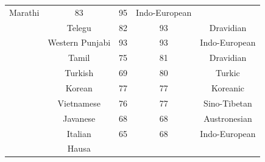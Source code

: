 {\begin{tabular}{|c|c|c|c|c|}
Marathi &
	

83 &
	

95 &
	

Indo-European \\

	\thetablecount\stepcounter{tablecount} &
Telegu &
	

82 &
	

93 &
	

Dravidian \\
	\thetablecount\stepcounter{tablecount} &

Western Punjabi &
	

93 &
	

93 &
	

Indo-European \\

	\thetablecount\stepcounter{tablecount} &
Tamil &
	

75 &
	

81 &
	

Dravidian \\

	\thetablecount\stepcounter{tablecount} &
Turkish &
	

69 &
	

80 &
	

Turkic \\

	\thetablecount\stepcounter{tablecount} &
Korean &
	

77 &
	

77 &
	

Koreanic \\

	\thetablecount\stepcounter{tablecount} &
Vietnamese &
	

76 &
	

77 &
	

Sino-Tibetan \\

	\thetablecount\stepcounter{tablecount} &
Javanese &
	

68 &
	

68 &
	

Austronesian \\

	\thetablecount\stepcounter{tablecount} &
Italian &
	

65 &
	

68 &
	

Indo-European \\
	\thetablecount\stepcounter{tablecount} &

Hausa &
	


\end{tabular}}
